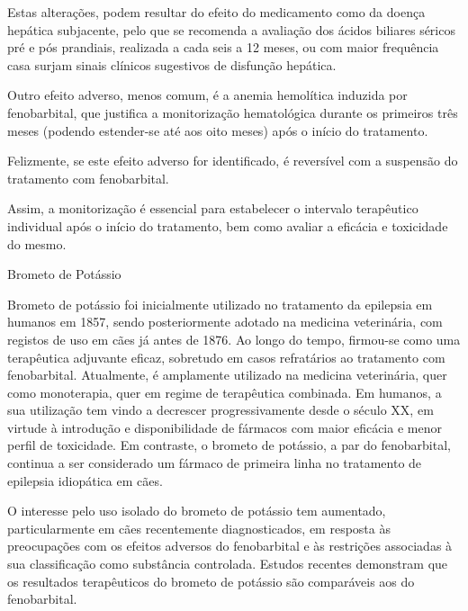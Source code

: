 Estas alterações, podem resultar do efeito do medicamento como da doença hepática subjacente, pelo que se recomenda a avaliação dos ácidos biliares séricos pré e pós prandiais, realizada a cada seis a 12 meses, ou com maior frequência casa surjam sinais clínicos sugestivos de disfunção hepática. \cite{Chandler2011}


Outro efeito adverso, menos comum, é a anemia hemolítica induzida por fenobarbital, que justifica a monitorização hematológica durante os primeiros três meses (podendo estender-se até aos oito meses) após o início do tratamento. \cite{Bersan2014} 

Felizmente, se este efeito adverso for identificado, é reversível com a suspensão do tratamento com fenobarbital. \cite{Bersan2014}


Assim, a monitorização é essencial para estabelecer o intervalo terapêutico individual após o início do tratamento, bem como avaliar a eficácia e toxicidade do mesmo.\cite{10.11}


Brometo de Potássio


Brometo de potássio foi inicialmente utilizado no tratamento da epilepsia em humanos em 1857, sendo posteriormente adotado na medicina veterinária, com registos de uso em cães já antes de 1876. \cite{javmakbr} Ao longo do tempo, firmou-se como uma terapêutica adjuvante eficaz, sobretudo em casos refratários ao tratamento com fenobarbital.  \cite{Lichtenauer2022} Atualmente, é amplamente utilizado na medicina veterinária, quer como monoterapia, quer em regime de terapêutica combinada. \cite{Lichtenauer2022}\cite{Fantinati2021}\cite{Gouveia2024} \cite{Dr}\cite{vol16} Em humanos, a sua utilização tem vindo a decrescer progressivamente desde o século XX, \cite{Lichtenauer2022} \cite{Dr} em virtude à introdução e disponibilidade de fármacos com maior eficácia e menor perfil de toxicidade. \cite{Lichtenauer2022} Em contraste, o brometo de potássio, a par do fenobarbital, continua a ser considerado um fármaco de primeira linha no tratamento de epilepsia idiopática em cães. \cite{javmakbr} 


O interesse pelo uso isolado do brometo de potássio tem aumentado, particularmente em cães recentemente diagnosticados, em resposta às preocupações com os efeitos adversos do fenobarbital e às restrições associadas à sua classificação como substância controlada. \cite{javmakbr} Estudos recentes demonstram que os resultados terapêuticos do brometo de potássio são comparáveis aos do fenobarbital. \cite{Lichtenauer2022} 


